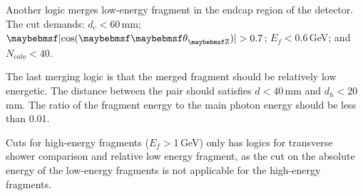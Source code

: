 Another logic merges low-energy fragment in the  endcap region of the detector. The cut demands: $d_c < 60$\,mm; $\absCosTheta > 0.7$; $E_f<$0.6\,GeV; and $N_{calo}<40$.


The last merging logic is that the merged fragment should be relatively low energetic. The distance between the pair should satisfies $d < 40$\,mm and $d_h < 20$\,mm. The ratio of the fragment energy  to the main photon energy should be less than 0.01.







Cuts for high-energy fragments ($E_f>$1\,GeV) only has logics for transverse shower comparison and relative low energy fragment, as the cut on the absolute energy of the low-energy fragments is not applicable for the  high-energy fragments.



